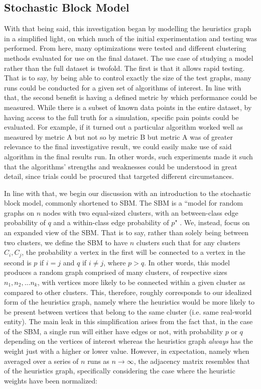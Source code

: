 \documentclass{article}
\begin{document}
\subsection{Stochastic Block Model}
With that being said, this investigation began by modelling the heuristics graph in a simplified light, on which much of the initial experimentation and testing was performed. From here, many optimizations were tested and different clustering methods evaluated for use on the final dataset. The use case of studying a model rather than the full dataset is twofold. The first is that it allows rapid testing. That is to say, by being able to control exactly the size of the test graphs, many runs could be conducted for a given set of algorithms of interest. In line with that, the second benefit is having a defined metric by which performance could be measured. While there is a subset of known data points in the entire dataset, by having access to the full truth for a simulation, specific pain points could be evaluated. For example, if it turned out a particular algorithm worked well as measured by metric A but not so by metric B but metric A was of greater relevance to the final investigative result, we could easily make use of said algorithm in the final results run. In other words, such experiments made it such that the algorithms' strengths and weaknesses could be understood in great detail, since trials could be procured that targeted different circumstances.

In line with that, we begin our discussion with an introduction to the stochastic block model, commonly shortened to SBM. The SBM is a ``model for random graphs on $n$ nodes with two equal-sized clusters, with an between-class edge probability of $q$ and a within-class edge probability of $p$" \cite{sbm}. We, instead, focus on an expanded view of the SBM. That is to say, rather than solely being between two clusters, we define the SBM to have $n$ clusters such that for any clusters $C_i, C_j$, the probability a vertex in the first will be connected to a vertex in the second is $p$ if $i=j$ and $q$ if $i\neq j$, where $p > q$. In other words, this model produces a random graph comprised of many clusters, of respective sizes $n_1,n_2,...n_k$, with vertices more likely to be connected within a given cluster as compared to other clusters. This, therefore, roughly corresponds to our idealized form of the heuristics graph, namely where the heuristics would be more likely to be present between vertices that belong to the same cluster (i.e. same real-world entity). The main leak in this simplification arises from the fact that, in the case of the SBM, a single run will either have edges or not, with probability $p$ or $q$ depending on the vertices of interest whereas the heuristics graph \textit{always} has the weight just with a higher or lower value. However, in expectation, namely when averaged over a series of $n$ runs as $n\rightarrow\infty$, the adjacency matrix resembles that of the heuristics graph, specifically considering the case where the heuristic weights have been normalized:
\end{document}

